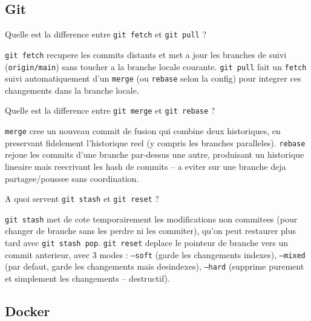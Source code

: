 \documentclass[11pt,a4paper]{article}
\begin{document}
\subsection{Git}

\begin{question} Quelle est la difference entre \texttt{git fetch} et \texttt{git pull} ?
\end{question}
\begin{reponse}
\texttt{git fetch} recupere les commits distants et met a jour les branches de suivi (\texttt{origin/main}) sans toucher a la branche locale courante. \texttt{git pull} fait un \texttt{fetch} suivi automatiquement d'un \texttt{merge} (ou \texttt{rebase} selon la config) pour integrer ces changements dans la branche locale.
\end{reponse}

\begin{question} Quelle est la difference entre \texttt{git merge} et \texttt{git rebase} ?
\end{question}
\begin{reponse}
\texttt{merge} cree un nouveau commit de fusion qui combine deux historiques, en preservant fidelement l'historique reel (y compris les branches paralleles). \texttt{rebase} rejoue les commits d'une branche par-dessus une autre, produisant un historique lineaire mais reecrivant les hash de commits -- a eviter sur une branche deja partagee/poussee sans coordination.
\end{reponse}

\begin{question} A quoi servent \texttt{git stash} et \texttt{git reset} ?
\end{question}
\begin{reponse}
\texttt{git stash} met de cote temporairement les modifications non commitees (pour changer de branche sans les perdre ni les commiter), qu'on peut restaurer plus tard avec \texttt{git stash pop}. \texttt{git reset} deplace le pointeur de branche vers un commit anterieur, avec 3 modes : \texttt{--soft} (garde les changements indexes), \texttt{--mixed} (par defaut, garde les changements mais desindexes), \texttt{--hard} (supprime purement et simplement les changements -- destructif).
\end{reponse}

\subsection{Docker}
\end{document}
